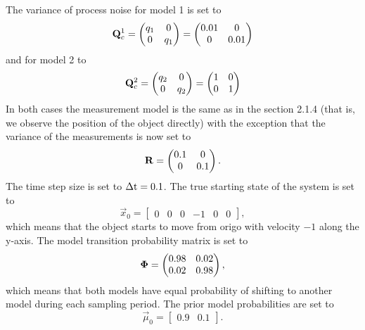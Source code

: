 The variance of process noise for model 1 is set to
%
\begin{equation} \mathbf{Q}_c^1 =
\begin{pmatrix} q_1 & 0 \\ 0 & q_1
\end{pmatrix} =
\begin{pmatrix} 0.01 & 0 \\ 0 & 0.01
\end{pmatrix}
\end{equation}
%
and for model 2 to
%
\begin{equation} \mathbf{Q}_c^2 =
\begin{pmatrix} q_2 & 0 \\ 0 & q_2
\end{pmatrix} =
\begin{pmatrix} 1 & 0 \\ 0 & 1
\end{pmatrix}
\end{equation}
%
In both cases the measurement model is the same as in the section
2.1.4 (that is, we observe the position of the object directly) with
the exception that the variance of the measurements is now set to
%
\begin{equation} \mathbf{R} = \begin{pmatrix} 0.1 & 0 \\ 0 & 0.1 \\
\end{pmatrix}.
\end{equation}
%
The time step size is set to $\operatorname{\Delta t} = 0.1$. The true starting state of
the system is set to
%
\begin{equation}
%
\vec{x}_0 = \begin{bmatrix} 0 & 0 & 0 & -1& 0 & 0\end{bmatrix},
%
\end{equation}
%
which means that the object starts to move from origo with velocity
$-1$ along the y-axis.
%
The model transition probability matrix is set to
%
\begin{equation}
%
\mat{\Phi} =
\begin{pmatrix} 0.98 & 0.02 \\ 0.02 & 0.98
\end{pmatrix}, \label{eq:imm_mtpm}
%
\end{equation}
%
which means that both models have equal probability of shifting to
another model during each sampling period. The prior model
probabilities are set to
%
\begin{equation}
%
\vec{\mu}_0 = \begin{bmatrix} 0.9 & 0.1
\end{bmatrix}. \label{eq:imm_modelprior}
%
\end{equation}
%

